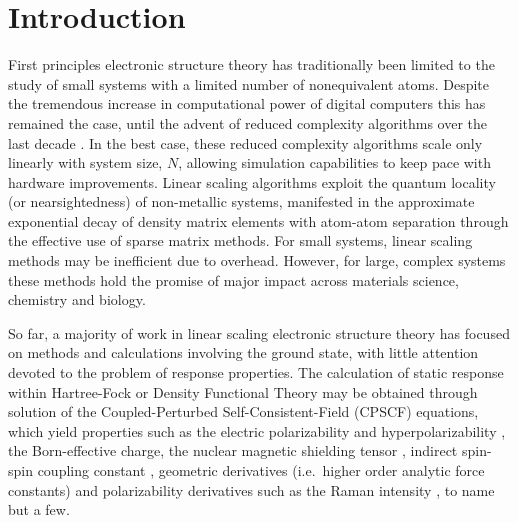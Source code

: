 \documentclass[prl,twocolumn,showpacs,twocolumngrid,superbib]{revtex4}
\begin{document}
%
%
%
%

\section{Introduction}
First principles electronic structure theory has traditionally been limited 
to the study of small systems with a limited number of nonequivalent atoms. 
Despite the tremendous increase in computational power of digital computers this 
has remained the case, until the advent of reduced complexity algorithms over the
last decade \cite{GGalli96,DBowler97,SGoedecker99,POrdejon00,VGogonea01,SWu02}. In the 
best case, these reduced complexity algorithms scale only linearly with system size, $N$, 
allowing simulation capabilities to keep pace with hardware improvements.
Linear scaling algorithms exploit the quantum locality (or nearsightedness) of 
non-metallic systems,  manifested in the approximate exponential decay of density matrix elements 
with atom-atom separation through the effective use of sparse matrix methods. For small systems,
linear scaling methods may be inefficient due to overhead.  However, for large, complex systems
these methods hold the promise of major impact across materials science, chemistry and biology. 

So far, a majority of work in linear scaling electronic structure theory 
has focused on methods and calculations involving the ground state, with little 
attention devoted to the problem of response properties.  The calculation of static
response within  Hartree-Fock or Density Functional Theory may be  obtained through solution 
of the Coupled-Perturbed Self-Consistent-Field (CPSCF) equations, which yield properties 
such as the electric polarizability and hyperpolarizability \cite{HSekino86,SKarna91}, 
the Born-effective charge, the nuclear magnetic shielding tensor \cite{KWolinski90}, 
indirect spin-spin coupling
constant \cite{CPennington91,OMalkin96}, geometric derivatives (i.e.~higher order
analytic force constants) \cite{RAmos89} and polarizability derivatives such as the Raman 
intensity \cite{MLazzeri03,OQuinet01}, to name but a few.
\end{document}
